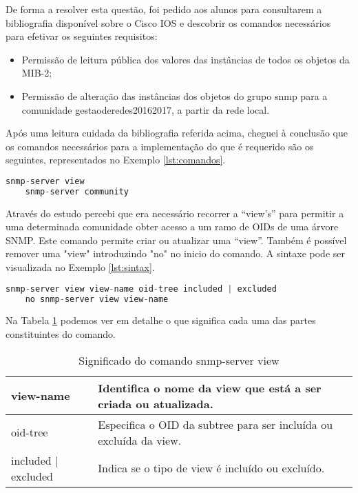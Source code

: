 \documentclass[../momento_1.tex]{subfiles}
\begin{document}
\par De forma a resolver esta questão, foi pedido aos alunos para consultarem a bibliografia disponível sobre o Cisco IOS e descobrir os comandos necessários para efetivar os seguintes requisitos:

\begin{itemize}
\item Permissão de leitura pública dos valores das instâncias de todos os objetos da MIB-2; 
\item Permissão de alteração das instâncias dos objetos do grupo snmp para a comunidade
gestaoderedes20162017, a partir da rede local.
\end{itemize}

\par Após uma leitura cuidada da bibliografia referida acima, cheguei à conclusão que os comandos
necessários para a implementação do que é requerido são os seguintes, representados no Exemplo \ref{lst:comandos}.\par

{
\begin{lstlisting}[caption={Comandos para implementação das permissões.},label={lst:comandos},language=JAVA]
	snmp-server view
	snmp-server community
\end{lstlisting}}

\par Através do estudo percebi que era necessário recorrer a “view’s” para permitir a uma determinada comunidade obter acesso a um ramo de OIDs de uma árvore SNMP. Este comando permite criar ou atualizar uma “view”. Também é possível remover uma "view" introduzindo "no" no inicio do comando. A sintaxe pode ser visualizada no Exemplo \ref{lst:sintax}. \par

{
\begin{lstlisting}[caption={Sintaxe do comando snmp-server view.},label={lst:sintax},language=JAVA]
	snmp-server view view-name oid-tree included | excluded
	no snmp-server view view-name
\end{lstlisting}}

Na Tabela \ref{tabela} podemos ver em detalhe o que significa cada uma das
partes constituintes do comando.\par


\begin{table}[H]
\centering
\caption{Significado do comando snmp-server view}
\label{tabela}
\begin{tabular}{|l|l|}
\hline
view-name           & Identifica o nome da view que está a ser criada ou atualizada.     \\ \hline
oid-tree            & Especifica o OID da subtree para ser incluída ou excluída da view. \\ \hline
included | excluded & Indica se o tipo de view é incluído ou excluído.                   \\ \hline
\end{tabular}
\end{table}
\end{document}
